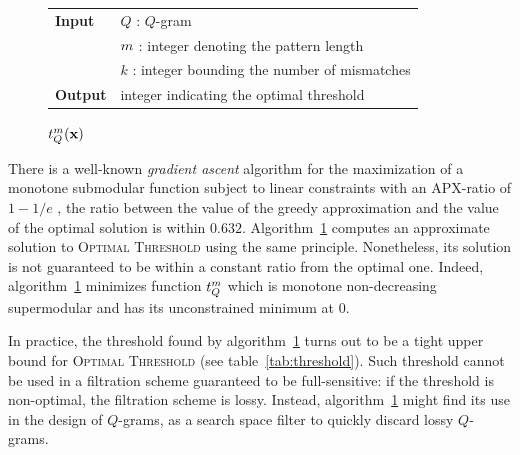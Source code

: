\begin{figure}[t]
\begin{center}
\begin{minipage}[t]{.8\textwidth}
\begin{algorithm}[H]
\begin{tabular}{ll}
\textbf{Input}  & $Q$ : $Q$-gram\\
				& $m$ : integer denoting the pattern length\\
				& $k$ : integer bounding the number of mismatches\\
\textbf{Output} & integer indicating the optimal threshold\\
\end{tabular}
\begin{algorithmic}[1]
\EndWhile
\State \Return $t^{m}_Q(\mathbf{x})$
\end{algorithmic}
\label{alg:qgram-threshold-apx}
\end{algorithm}
\end{minipage}
\end{center}
\end{figure}

There is a well-known \emph{gradient ascent} algorithm for the maximization of a monotone submodular function subject to linear constraints with an APX-ratio of $1 - 1/e$ \citep{Nemhauser1978}, \ie the ratio between the value of the greedy approximation and the value of the optimal solution is within $0.632$.
Algorithm~\ref{alg:qgram-threshold-apx} computes an approximate solution to \textsc{Optimal Threshold} using the same principle.
Nonetheless, its solution is not guaranteed to be within a constant ratio from the optimal one.
Indeed, algorithm~\ref{alg:qgram-threshold-apx} minimizes function $t_{Q}^{m}$ which is monotone non-decreasing supermodular and has its unconstrained minimum at $0$.

In practice, the threshold found by algorithm~\ref{alg:qgram-threshold-apx} turns out to be a tight upper bound for \textsc{Optimal Threshold} (see table~\ref{tab:threshold}).
Such threshold cannot be used in a filtration scheme guaranteed to be full-sensitive: if the threshold is non-optimal, the filtration scheme is lossy.
Instead, algorithm~\ref{alg:qgram-threshold-apx} might find its use in the design of $Q$-grams, as a search space filter to quickly discard lossy $Q$-grams.

